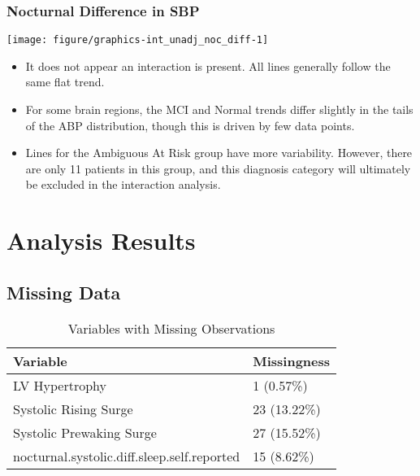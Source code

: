 \documentclass[10pt]{article}\usepackage[]{graphicx}\usepackage[]{color}
\makeatletter
\def\maxwidth{ %
  \ifdim\Gin@nat@width>\linewidth
    \linewidth
  \else
    \Gin@nat@width
  \fi
}
\newenvironment{knitrout}{}{} %
\makeatother
\begin{document}
\subsubsection{Nocturnal Difference in SBP}
\begin{knitrout}
\color{fgcolor}

{\centering \texttt{[image: figure/graphics-int\_unadj\_noc\_diff-1]} 

}



\end{knitrout}

\begin{itemize}
  \item It does not appear an interaction is present. All lines generally follow the same flat trend. 
  \item For some brain regions, the MCI and Normal trends differ slightly in the tails of the ABP distribution, though this is driven by few data points.
  \item Lines for the Ambiguous At Risk group have more variability. However, there are only 11 patients in this group, and this diagnosis category will ultimately be excluded in the interaction analysis.
\end{itemize}


\clearpage

\section{Analysis Results}

\subsection{Missing Data}
\begin{table}[ht]
\centering
\caption{Variables with Missing Observations} 
\begin{tabular}{ll}
  \hline
Variable & Missingness \\ 
  \hline
LV Hypertrophy & 1 (0.57\%) \\ 
  Systolic Rising Surge & 23 (13.22\%) \\ 
  Systolic Prewaking Surge & 27 (15.52\%) \\ 
  nocturnal.systolic.diff.sleep.self.reported & 15 (8.62\%) \\ 
   \hline
\end{tabular}
\end{table}
\end{document}

